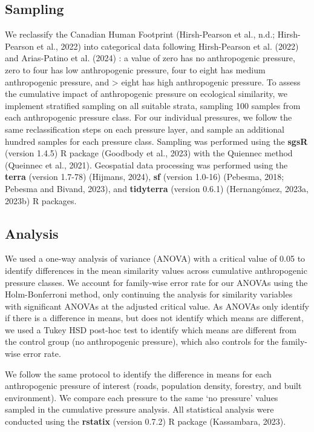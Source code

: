 \documentclass[
]{agujournal2019}
\begin{document}
\subsection{Sampling}\label{sampling}

We reclassify the Canadian Human Footprint (Hirsh-Pearson et al., n.d.;
Hirsh-Pearson et al., 2022) into categorical data following
Hirsh-Pearson et al. (2022) and Arias-Patino et al. (2024) : a value of
zero has no anthropogenic pressure, zero to four has low anthropogenic
pressure, four to eight has medium anthropogenic pressure, and
\textgreater{} eight has high anthropogenic pressure. To assess the
cumulative impact of anthropogenic pressure on ecological similarity, we
implement stratified sampling on all suitable strata, sampling 100
samples from each anthropogenic pressure class. For our individual
pressures, we follow the same reclassification steps on each pressure
layer, and sample an additional hundred samples for each pressure class.
Sampling was performed using the \textbf{sgsR} (version 1.4.5) R package
(Goodbody et al., 2023) with the Quiennec method (Queinnec et al.,
2021). Geospatial data processing was performed using the \textbf{terra}
(version 1.7-78) (Hijmans, 2024), \textbf{sf} (version 1.0-16) (Pebesma,
2018; Pebesma and Bivand, 2023), and \textbf{tidyterra} (version 0.6.1)
(Hernangómez, 2023a, 2023b) R packages.

\subsection{Analysis}\label{analysis}

We used a one-way analysis of variance (ANOVA) with a critical value of
0.05 to identify differences in the mean similarity values across
cumulative anthropogenic pressure classes. We account for family-wise
error rate for our ANOVAs using the Holm-Bonferroni method, only
continuing the analysis for similarity variables with significant ANOVAs
at the adjusted critical value. As ANOVAs only identify if there is a
difference in means, but does not identify which means are different, we
used a Tukey HSD post-hoc test to identify which means are different
from the control group (no anthropogenic pressure), which also controls
for the family-wise error rate.

We follow the same protocol to identify the difference in means for each
anthropogenic pressure of interest (roads, population density, forestry,
and built environment). We compare each pressure to the same `no
pressure' values sampled in the cumulative pressure analysis. All
statistical analysis were conducted using the \textbf{rstatix} (version
0.7.2) R package (Kassambara, 2023).
\end{document}
